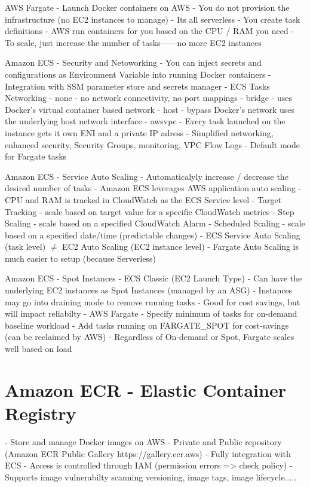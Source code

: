 AWS Fargate
- Launch Docker containers on AWS
- You do not provision the infrastructure (no EC2 instances to manage)
- Its all serverless
- You create task definitions
- AWS run containers for you based on the CPU / RAM you need
- To scale, just increase the number of tasks------no more EC2 instances


Amazon ECS - Security and Netoworking
- You can inject secrets and configurations as Environment Variable into running Docker containers
- Integration with SSM parameter store and secrets manager
- ECS Tasks Networking
- none - no network connectivity, no port mappings
- bridge - uses Docker's virtual container based network
- host - bypass Docker's network uses the underlying host network interface
- awsvpc
- Every task launched on the instance gets it own ENI and a private IP adress
- Simplified networking, enhanced security, Security Groups, monitoring, VPC Flow Logs
- Default mode for Fargate tasks

Amazon ECS - Service Auto Scaling
- Automaticalyly increase / decrease the desired number of tasks
- Amazon ECS leverages AWS application auto scaling
- CPU and RAM is tracked in CloudWatch as the ECS Service level
- Target Tracking - scale based on target value for a specific CloudWatch metrics
- Step Scaling - scale based on a specified CloudWatch Alarm
- Scheduled Scaling - scale based on a specified date/time (predictable changes)
- ECS Service Auto Scaling (task level) \( \neq \) EC2 Auto Scaling (EC2 instance level)
- Fargate Auto Scaling is much easier to setup (because Serverless)

Amazon ECS - Spot Instances
- ECS Classic (EC2 Launch Type)
- Can have the underlying EC2 instances as Spot Instances (managed by an ASG)
- Instances may go into draining mode to remove running tasks
- Good for cost savings, but will impact reliabilty
- AWS Fargate
- Specify minimum of tasks for on-demand baseline workload
- Add tasks running on FARGATE\_SPOT for cost-savings (can be reclaimed by AWS)
- Regardless of On-demand or Spot, Fargate scales well based on load


\section{Amazon ECR - Elastic Container Registry}
- Store and manage Docker images on AWS
- Private and Public repository (Amazon ECR Public Gallery https://gallery.ecr.aws)
- Fully integration with ECS
- Access is controlled through IAM (permission errors => check policy)
- Supports image vulnerabilty scanning versioning, image tags, image lifecycle.....

